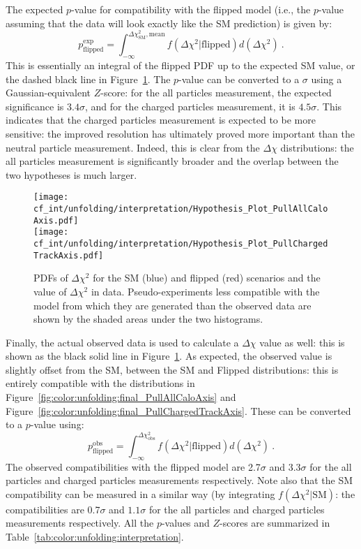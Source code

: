 	The expected $p$-value for compatibility with the flipped model (i.e., the $p$-value assuming that the data will look exactly like the SM prediction) is given by:
	\begin{equation}
  p^{\mathrm{exp}}_{\mathrm{flipped}} = \int^{\Delta\chi^2_{\mathrm{SM}}, \mathrm{mean}}_{-\infty} f(\Delta\chi^2|\mathrm{flipped}) d(\Delta\chi^2) \ .
\end{equation}
	This is essentially an integral of the flipped PDF up to the expected SM value, or the dashed black line in Figure~\ref{fig:color:unfolding:deltachi}. The $p$-value can be converted to a $\sigma$ using a Gaussian-equivalent $Z$-score: for the all particles measurement, the expected significance is $3.4\sigma$, and for the charged particles measurement, it is $4.5\sigma$. This indicates that the charged particles measurement is expected to be more sensitive: the improved resolution has ultimately proved more important than the neutral particle measurement. Indeed, this is clear from the $\Delta \chi$ distributions: the all particles measurement is significantly broader and the overlap between the two hypotheses is much larger.

\begin{figure}
\texttt{[image: cf\_int/unfolding/interpretation/Hypothesis\_Plot\_PullAllCaloAxis.pdf]} \\
  \texttt{[image: cf\_int/unfolding/interpretation/Hypothesis\_Plot\_PullChargedTrackAxis.pdf]}
  \caption{PDFs of $\Delta\chi^2$ for the SM (blue) and flipped (red) scenarios
    and the value of $\Delta\chi^2$ in data. Pseudo-experiments less compatible with
    the model from which they are generated than the observed data are shown by the
  shaded areas under the two histograms.}
  \label{fig:color:unfolding:deltachi}
\end{figure}

	Finally, the actual observed data is used to calculate a $\Delta \chi$ value as well: this is shown as the black solid line in Figure~\ref{fig:color:unfolding:deltachi}. As expected, the observed value is slightly offset from the SM, between the SM and Flipped distributions: this is entirely compatible with the distributions in Figure~\ref{fig:color:unfolding:final_PullAllCaloAxis} and Figure~\ref{fig:color:unfolding:final_PullChargedTrackAxis}. These can be converted to a $p$-value using:
	\begin{equation}
  p^{\mathrm{obs}}_{\mathrm{flipped}} = \int^{\Delta\chi^2_{\mathrm{obs}}}_{-\infty} f(\Delta\chi^2|\mathrm{flipped}) d(\Delta\chi^2) \ .
\end{equation}
	The observed compatibilities with the flipped model are 2.7$\sigma$ and 3.3$\sigma$ for the all particles and charged particles measurements respectively. Note also that the SM compatibility can be measured in a similar way (by integrating $f(\Delta\chi^2|\mathrm{SM})$: the compatibilities are 0.7$\sigma$ and $1.1\sigma$ for the all particles and charged particles measurements respectively. All the $p$-values and $Z$-scores are summarized in Table~\ref{tab:color:unfolding:interpretation}.


